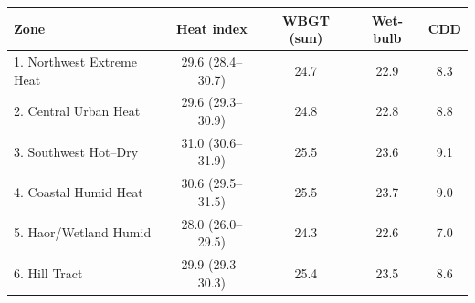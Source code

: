 \begin{tabular}{lcccc}
\toprule
Zone & Heat index & WBGT (sun) & Wet-bulb & CDD \\
\midrule
1. Northwest Extreme Heat & 29.6 (28.4--30.7) & 24.7 & 22.9 & 8.3 \\
2. Central Urban Heat     & 29.6 (29.3--30.9) & 24.8 & 22.8 & 8.8 \\
3. Southwest Hot--Dry     & 31.0 (30.6--31.9) & 25.5 & 23.6 & 9.1 \\
4. Coastal Humid Heat     & 30.6 (29.5--31.5) & 25.5 & 23.7 & 9.0 \\
5. Haor/Wetland Humid     & 28.0 (26.0--29.5) & 24.3 & 22.6 & 7.0 \\
6. Hill Tract             & 29.9 (29.3--30.3) & 25.4 & 23.5 & 8.6 \\
\bottomrule
\end{tabular}
